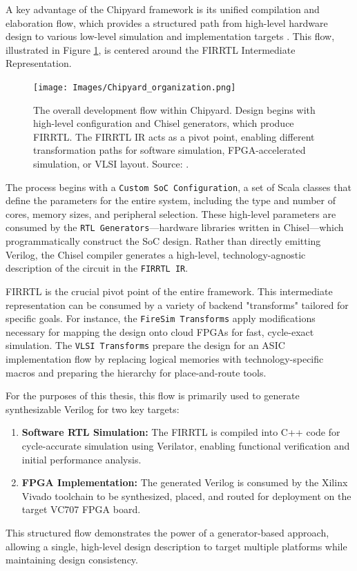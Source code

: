 A key advantage of the Chipyard framework is its unified compilation and elaboration flow, which provides a structured path from high-level hardware design to various low-level simulation and implementation targets \cite{chipyard}. This flow, illustrated in Figure \ref{fig:chipyard_elaboration_flow}, is centered around the FIRRTL Intermediate Representation.

\begin{figure}[htbp]
    \centering
    \texttt{[image: Images/Chipyard\_organization.png]}
    \caption[The Chipyard Development and Compilation Flow]{The overall development flow within Chipyard. Design begins with high-level configuration and Chisel generators, which produce FIRRTL. The FIRRTL IR acts as a pivot point, enabling different transformation paths for software simulation, FPGA-accelerated simulation, or VLSI layout. Source: \cite{chipyard}.}
    \label{fig:chipyard_elaboration_flow}
\end{figure}

The process begins with a \texttt{Custom SoC Configuration}, a set of Scala classes that define the parameters for the entire system, including the type and number of cores, memory sizes, and peripheral selection. These high-level parameters are consumed by the \texttt{RTL Generators}—hardware libraries written in Chisel—which programmatically construct the SoC design. Rather than directly emitting Verilog, the Chisel compiler generates a high-level, technology-agnostic description of the circuit in the \texttt{FIRRTL IR}.

FIRRTL is the crucial pivot point of the entire framework. This intermediate representation can be consumed by a variety of backend "transforms" tailored for specific goals. For instance, the \texttt{FireSim Transforms} apply modifications necessary for mapping the design onto cloud FPGAs for fast, cycle-exact simulation. The \texttt{VLSI Transforms} prepare the design for an ASIC implementation flow by replacing logical memories with technology-specific macros and preparing the hierarchy for place-and-route tools.

For the purposes of this thesis, this flow is primarily used to generate synthesizable Verilog for two key targets: 
\begin{enumerate}
    \item \textbf{Software RTL Simulation:} The FIRRTL is compiled into C++ code for cycle-accurate simulation using Verilator, enabling functional verification and initial performance analysis.
    \item \textbf{FPGA Implementation:} The generated Verilog is consumed by the Xilinx Vivado toolchain to be synthesized, placed, and routed for deployment on the target VC707 FPGA board.
\end{enumerate}
This structured flow demonstrates the power of a generator-based approach, allowing a single, high-level design description to target multiple platforms while maintaining design consistency.

